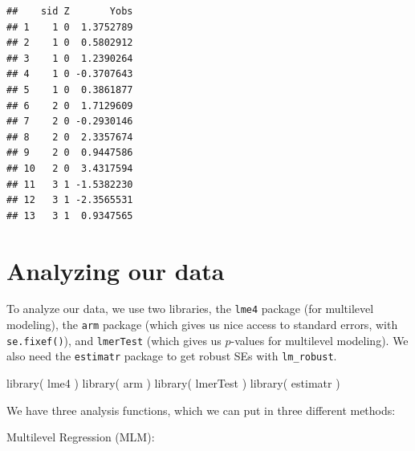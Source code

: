 \documentclass[
]{book}
\newenvironment{Shaded}{\begin{snugshade}}{\end{snugshade}}
\newcommand{\AttributeTok}[1]{\textcolor[rgb]{0.77,0.63,0.00}{#1}}
\newcommand{\ControlFlowTok}[1]{\textcolor[rgb]{0.13,0.29,0.53}{\textbf{#1}}}
\newcommand{\DecValTok}[1]{\textcolor[rgb]{0.00,0.00,0.81}{#1}}
\newcommand{\FunctionTok}[1]{\textcolor[rgb]{0.00,0.00,0.00}{#1}}
\newcommand{\NormalTok}[1]{#1}
\newcommand{\OtherTok}[1]{\textcolor[rgb]{0.56,0.35,0.01}{#1}}
\newcommand{\SpecialCharTok}[1]{\textcolor[rgb]{0.00,0.00,0.00}{#1}}
\newcommand{\StringTok}[1]{\textcolor[rgb]{0.31,0.60,0.02}{#1}}
\begin{document}
\begin{verbatim}
##    sid Z       Yobs
## 1    1 0  1.3752789
## 2    1 0  0.5802912
## 3    1 0  1.2390264
## 4    1 0 -0.3707643
## 5    1 0  0.3861877
## 6    2 0  1.7129609
## 7    2 0 -0.2930146
## 8    2 0  2.3357674
## 9    2 0  0.9447586
## 10   2 0  3.4317594
## 11   3 1 -1.5382230
## 12   3 1 -2.3565531
## 13   3 1  0.9347565
\end{verbatim}

\hypertarget{analyzing-our-data}{%
\section{Analyzing our data}\label{analyzing-our-data}}

To analyze our data, we use two libraries, the \texttt{lme4} package (for multilevel modeling), the \texttt{arm} package (which gives us nice access to standard errors, with \texttt{se.fixef()}), and \texttt{lmerTest} (which gives us \(p\)-values for multilevel modeling).
We also need the \texttt{estimatr} package to get robust SEs with \texttt{lm\_robust}.

\begin{Shaded}
\begin{Highlighting}[]
\FunctionTok{library}\NormalTok{( lme4 )}
\FunctionTok{library}\NormalTok{( arm )}
\FunctionTok{library}\NormalTok{( lmerTest )}
\FunctionTok{library}\NormalTok{( estimatr )}
\end{Highlighting}
\end{Shaded}

We have three analysis functions, which we can put in three different methods:

Multilevel Regression (MLM):

\begin{Shaded}
\end{Shaded}
\end{document}
